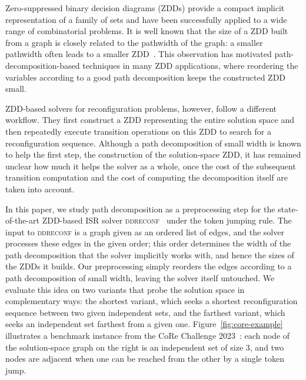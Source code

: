 \documentclass[conference]{IEEEtran}
\begin{document}
Zero-suppressed binary decision diagrams (ZDDs) provide a compact implicit
representation of a family of sets and have been successfully applied to a wide
range of combinatorial problems.
It is well known that the size of a ZDD built from a graph is closely related to
the pathwidth of the graph: a smaller pathwidth often leads to a smaller
ZDD~\cite{inoue16}.
This observation has motivated path-decomposition-based techniques in many ZDD
applications, where reordering the variables according to a good path
decomposition keeps the constructed ZDD small.

ZDD-based solvers for reconfiguration problems, however, follow a different
workflow.
They first construct a ZDD representing the entire solution space and then
repeatedly execute transition operations on this ZDD to search for a
reconfiguration sequence.
Although a path decomposition of small width is known to help the first step,
the construction of the solution-space ZDD, it has remained unclear how much it
helps the solver as a whole, once the cost of the subsequent transition
computation and the cost of computing the decomposition itself are taken into
account.

In this paper, we study path decomposition as a preprocessing step for the
state-of-the-art ZDD-based ISR solver \textsc{ddreconf}~\cite{ItoKNSSTT23} under
the token jumping rule.
The input to \textsc{ddreconf} is a graph given as an ordered list of edges, and
the solver processes these edges in the given order; this order determines the
width of the path decomposition that the solver implicitly works with, and hence
the sizes of the ZDDs it builds.
Our preprocessing simply reorders the edges according to a path decomposition of
small width, leaving the solver itself untouched.
We evaluate this idea on two variants that probe the solution space in
complementary ways: the shortest variant, which seeks a shortest reconfiguration
sequence between two given independent sets, and the farthest variant, which
seeks an independent set farthest from a given one.
Figure~\ref{fig:core-example} illustrates a benchmark instance from the CoRe
Challenge 2023~\cite{sotaokit24}: each node of the solution-space graph on the
right is an independent set of size $3$, and two nodes are adjacent when one can
be reached from the other by a single token jump.
\end{document}
